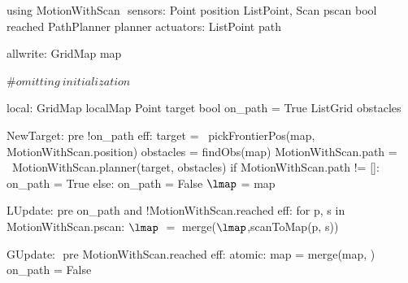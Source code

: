 using MotionWithScan $\label{moddef}$
    sensors:
        Point position
        List\<Point, Scan\> pscan
        bool reached
        PathPlanner planner
    actuators:
        List\<Point\> path

allwrite:$\label{awvar}$
    GridMap map

#$\mathit{omitting\ initialization}$

local:
   GridMap localMap
   Point target
   bool on_path = True
   List\<Grid\> obstacles

NewTarget:$\label{newpt}$
  pre !on_path
  eff:
     target = \
        pickFrontierPos(map, MotionWithScan.position)
     obstacles = findObs(map)
     MotionWithScan.path = \
        MotionWithScan.planner(target, obstacles)
     if MotionWithScan.path != []:
        on_path = True
     else:
        on_path = False
     $\lmap$ = map

LUpdate:$\label{lup}$
   pre on_path and !MotionWithScan.reached
   eff:
      for p, s in MotionWithScan.pscan:
         $\lmap$ $=$ merge($\lmap$,scanToMap(p, s))

GUpdate: $\label{gup}$
  pre MotionWithScan.reached
  eff: atomic:
        map = merge(map, \lmap)
        on_path = False
